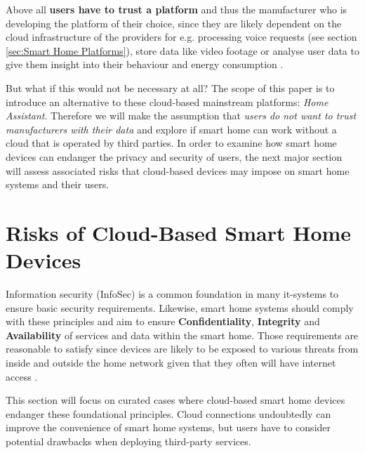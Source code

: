 Above all \textbf{users have to trust a platform} and thus the manufacturer who is developing the platform of their choice, since they are likely dependent on the cloud infrastructure of the providers for e.g. processing voice requests (see section \ref{sec:Smart Home Platforms}), store data like video footage \cite{Kastrenakes2019HKSC} or analyse user data to give them insight into their behaviour \cite{Liao2018AH} and energy consumption \cite{SamsungSmartThingsEnergy}.

But what if this would not be necessary at all? The scope of this paper is to introduce an alternative to these cloud-based mainstream platforms: \textit{Home Assistant}. Therefore we will make the assumption that \textit{users do not want to trust manufacturers with their data} and explore if smart home can work without a cloud that is operated by third parties. In order to examine how smart home devices can endanger the privacy and security of users, the next major section will assess associated risks that cloud-based devices may impose on smart home systems and their users.

\newpage


\section{Risks of Cloud-Based Smart Home Devices}
Information security (InfoSec) is a common foundation in many it-systems to ensure basic security requirements. Likewise, smart home systems should comply with these principles and aim to ensure \textbf{Confidentiality}, \textbf{Integrity} and \textbf{Availability} of services and data within the smart home. Those requirements are reasonable to satisfy since devices are likely to be exposed to various threats from inside and outside the home network given that they often will have internet access \cite{SecurityConsiderations-7354752}.


This section will focus on curated cases where cloud-based smart home devices endanger these foundational principles. Cloud connections undoubtedly can improve the convenience of smart home systems, but users have to consider potential drawbacks when deploying third-party services.

